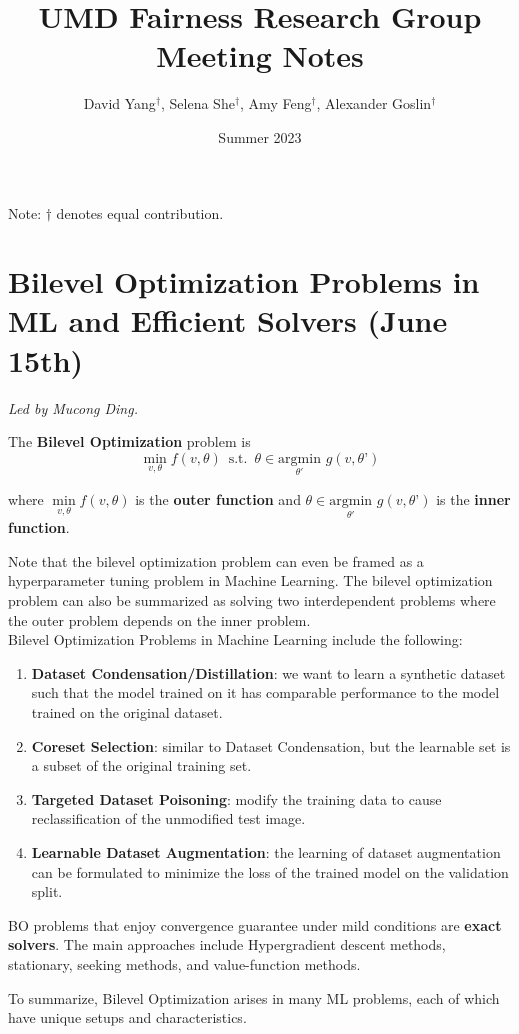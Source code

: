 \documentclass[12pt]{amsart}
\title{UMD Fairness Research Group Meeting Notes}
\author{David Yang$^{\dagger}$, Selena She$^{\dagger}$, Amy Feng$^{\dagger}$, Alexander Goslin$^{\dagger}$}
\date{Summer 2023}
\begin{document}
\maketitle

\begin{center}
    Note: $\dagger$ denotes equal contribution.
\end{center}

\section{Bilevel Optimization Problems in ML and Efficient Solvers (June 15th)}

\textit{Led by Mucong Ding.} \\

\begin{definition}
The \textbf{Bilevel Optimization} problem is 
\[\min_{v, \theta} f(v, \theta) \, \text{   s.t.  } \, \theta \in \underset{\theta'}{\mathrm{argmin}} \, \, g(v, \theta’)\]

\noindent where $\underset{v, \theta}\min f(v, \theta)$ is the \textbf{outer function} and $\theta \in \underset{\theta'}{\mathrm{argmin}} \, \, g(v, \theta’)$ is the \textbf{inner function}.
\end{definition}

Note that the bilevel optimization problem can even be framed as a hyperparameter tuning problem in Machine Learning. The bilevel optimization problem can also be summarized as solving two interdependent problems where the outer problem depends on the inner problem. \\

Bilevel Optimization Problems in Machine Learning include the following:
\begin{enumerate}
    \item \textbf{Dataset Condensation/Distillation}: we want to learn a synthetic dataset such that the model trained on it has comparable performance to the model trained on the original dataset.
    \item \textbf{Coreset Selection}: similar to Dataset Condensation, but the learnable set is a subset of the original training set.
    \item \textbf{Targeted Dataset Poisoning}: modify the training data to cause reclassification of the unmodified test image.
    \item \textbf{Learnable Dataset Augmentation}: the learning of dataset augmentation can be formulated to minimize the loss of the trained model on the validation split.
\end{enumerate}

\begin{definition}BO problems that enjoy convergence guarantee under mild conditions are \textbf{exact solvers}. The main approaches include Hypergradient descent methods, stationary, seeking methods, and value-function methods.
\end{definition}

To summarize, Bilevel Optimization arises in many ML problems, each of which have unique setups and characteristics.
\end{document}
